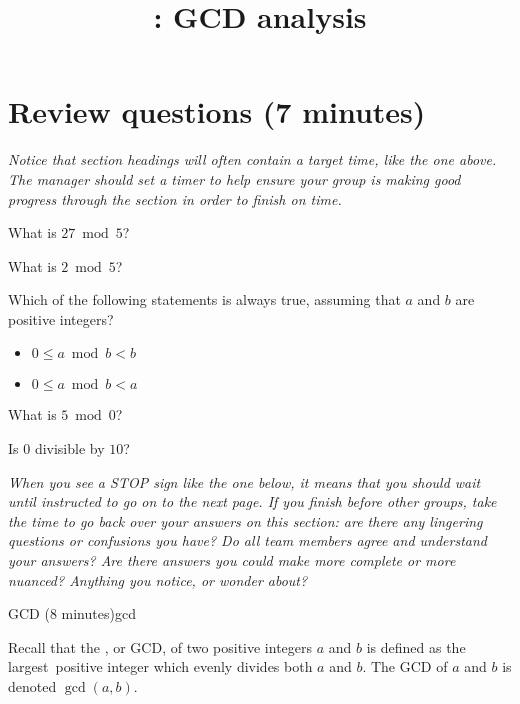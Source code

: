 \documentclass{tufte-handout}
\title{\thecourse: GCD analysis}
\date{}
\begin{document}
\maketitle

\section{Review questions (7 minutes)}

\begin{mdframed}
  \emph{Notice that section headings will often contain a target time,
like the one above.  The manager should set a timer to help
ensure your group is making good progress through the section in order
to finish on time.}
\end{mdframed}

\begin{questions}
  \item What is $27 \bmod 5$?
  \item What is $2 \bmod 5$?
  \item Which of the following statements is always true, assuming that $a$
    and $b$ are positive integers?
    \begin{itemize}
    \item $0 \leq a \bmod b < b$
    \item $0 \leq a \bmod b < a$
    \end{itemize}
  \item What is $5 \bmod 0$?
  \item Is $0$ divisible by $10$?
\end{questions}
\vfill
\begin{mdframed}[innerrightmargin=1cm]
  \emph{When you see a STOP sign like the one below, it means that you
    should wait until instructed to go on to the next page.  If you
    finish before other groups, take the time to go back over your
    answers on this section: are there any lingering questions or
    confusions you have? Do all team members agree and understand your
    answers?  Are there answers you could make more complete or more
    nuanced?  Anything you notice, or wonder about?}
\end{mdframed}
\pause

\begin{model*}{GCD (8 minutes)}{gcd}
\begin{defn}
  Recall that the , or GCD, of two
  positive integers $a$ and $b$ is defined as the
  largest\footnotemark\ positive integer which evenly divides both $a$
  and $b$.  The GCD of $a$ and $b$ is denoted $\gcd(a,b)$.
\end{defn}
\end{model*}
\end{document}
